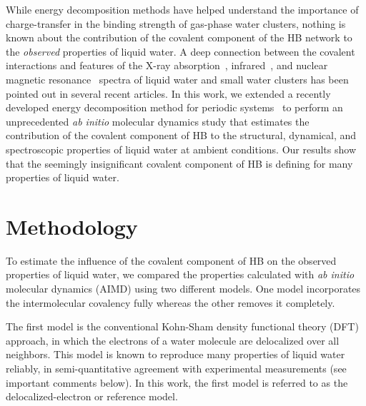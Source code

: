 \documentclass[journal=jacsat,manuscript=article]{achemso}
\begin{document}

While energy decomposition methods have helped understand the importance of charge-transfer in the binding strength of gas-phase water clusters, nothing is known about the contribution of the covalent component of the HB network to the \emph{observed} properties of liquid water. 
A deep connection between the covalent interactions and features of the X-ray absorption~\cite{fransson2016x, NatureComm2013}, infrared~\cite{JPCL2013, Faraday2011, lenz2006theoretical}, and nuclear magnetic resonance~\cite{NatureComm2015} spectra of liquid water and small water clusters has been pointed out in several recent articles. 
In this work, we extended a recently developed energy decomposition method for periodic systems~\cite{Khaliullin2013JCTC} to perform an unprecedented \emph{ab initio} molecular dynamics study that estimates the contribution of the covalent component of HB to the structural, dynamical, and spectroscopic properties of liquid water at ambient conditions. 
Our results show that the seemingly insignificant covalent component of HB is defining for many properties of liquid water. 

\section{Methodology}


To estimate the influence of the covalent component of HB on the observed properties of liquid water, we compared the properties calculated with \emph{ab initio} molecular dynamics (AIMD) using two different models. 
One model incorporates the intermolecular covalency fully whereas the other removes it completely.

The first model is the conventional Kohn-Sham density functional theory (DFT) approach, in which the electrons of a water molecule are delocalized over all neighbors. 
This model is known to reproduce many properties of liquid water reliably, in semi-quantitative agreement with experimental measurements (see important comments below). 
In this work, the first model is referred to as the delocalized-electron or reference model. 
\end{document}
